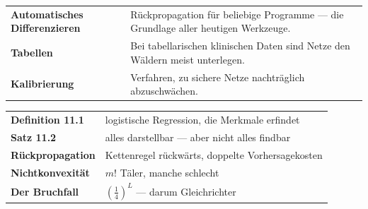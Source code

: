 \begin{forschung}
\begin{center}
{\small
\renewcommand{\arraystretch}{1.45}
\begin{tabular}{@{}P{2.8cm}P{5.4cm}@{}}
\toprule
\textbf{Automatisches Differenzieren} & Rückpropagation für beliebige Programme --- die Grundlage aller heutigen Werkzeuge.\\
\textbf{Tabellen} & Bei tabellarischen klinischen Daten sind Netze den Wäldern meist unterlegen.\\
\textbf{Kalibrierung} & Verfahren, zu sichere Netze nachträglich abzuschwächen.\\
\bottomrule
\end{tabular}}
\end{center}

\begin{center}
\begin{minipage}{0.88\textwidth}
\end{minipage}
\end{center}
\end{forschung}

\begin{merksatz}
\begin{center}
\renewcommand{\arraystretch}{1.5}
\begin{tabular}{@{}P{3.0cm}P{5.6cm}@{}}
\toprule
\textbf{Definition 11.1} & logistische Regression, die Merkmale erfindet\\
\textbf{Satz 11.2} & alles darstellbar --- aber nicht alles findbar\\
\textbf{Rückpropagation} & Kettenregel rückwärts, doppelte Vorhersagekosten\\
\textbf{Nichtkonvexität} & $m!$ Täler, manche schlecht\\
\textbf{Der Bruchfall} & $(\tfrac14)^{L}$ --- darum Gleichrichter\\
\bottomrule
\end{tabular}
\end{center}

\begin{center}
\begin{minipage}{0.88\textwidth}
\end{minipage}
\end{center}
\end{merksatz}
